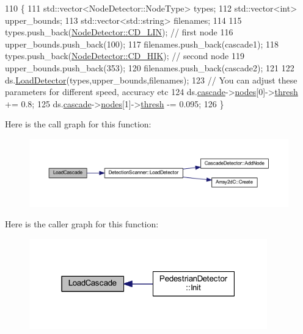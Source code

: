 \begin{DoxyCode}
110 \{
111     std::vector<NodeDetector::NodeType> types;
112     std::vector<int> upper\_bounds;
113     std::vector<std::string> filenames;
114 
115     types.push\_back(\mbox{\hyperlink{class_node_detector_a7188c48dfe6b88b3b7f47c599c4832bda0fae40660f7fc68812bec11a7de3413e}{NodeDetector::CD\_LIN}}); \textcolor{comment}{// first node}
116     upper\_bounds.push\_back(100);
117     filenames.push\_back(cascade1);
118     types.push\_back(\mbox{\hyperlink{class_node_detector_a7188c48dfe6b88b3b7f47c599c4832bda65deee8e79173b207da52debff561c83}{NodeDetector::CD\_HIK}}); \textcolor{comment}{// second node}
119     upper\_bounds.push\_back(353);
120     filenames.push\_back(cascade2);
121 
122     ds.\mbox{\hyperlink{class_detection_scanner_a36c4db431f28648b82bd6e55afb67008}{LoadDetector}}(types,upper\_bounds,filenames);
123     \textcolor{comment}{// You can adjust these parameters for different speed, accuracy etc}
124     ds.\mbox{\hyperlink{class_detection_scanner_a5fd4ac1b6a6c56a95543eca549c26634}{cascade}}->\mbox{\hyperlink{class_cascade_detector_a7977422f255cf4d753665c0c6a0b0f07}{nodes}}[0]->\mbox{\hyperlink{class_node_detector_a2fd8792e80f3f31d2d07831a5169935f}{thresh}} += 0.8;
125     ds.\mbox{\hyperlink{class_detection_scanner_a5fd4ac1b6a6c56a95543eca549c26634}{cascade}}->\mbox{\hyperlink{class_cascade_detector_a7977422f255cf4d753665c0c6a0b0f07}{nodes}}[1]->\mbox{\hyperlink{class_node_detector_a2fd8792e80f3f31d2d07831a5169935f}{thresh}} -= 0.095;
126 \}
\end{DoxyCode}
Here is the call graph for this function\+:\nopagebreak
\begin{figure}[H]
\begin{center}
\leavevmode
\includegraphics[width=350pt]{c4-pedestrian-detector_8cpp_a1c2c730891bb9a5800d3761e8cfaa160_cgraph}
\end{center}
\end{figure}
Here is the caller graph for this function\+:\nopagebreak
\begin{figure}[H]
\begin{center}
\leavevmode
\includegraphics[width=292pt]{c4-pedestrian-detector_8cpp_a1c2c730891bb9a5800d3761e8cfaa160_icgraph}
\end{center}
\end{figure}
